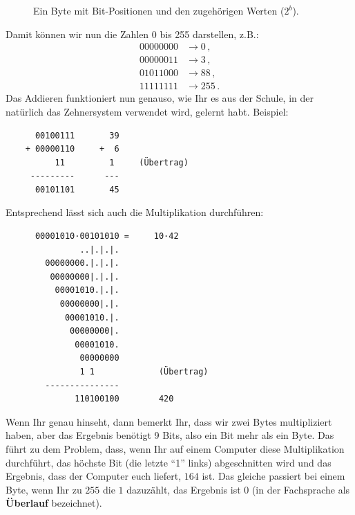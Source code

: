 \begin{figure}[h]
  \centering
  \caption{Ein Byte mit Bit-Positionen und den zugehörigen Werten ($2^b$).}
  \label{fig:byte_values}
\end{figure}

\noindent
Damit können wir nun die Zahlen 0 bis 255 darstellen, z.B.:
\begin{align*}
  00000000 &\rightarrow 0\,, \\
  00000011 &\rightarrow 3\,, \\
  01011000 &\rightarrow 88\,, \\
  11111111 &\rightarrow 255\,.
\end{align*}
Das Addieren funktioniert nun genauso, wie Ihr es aus der Schule, in der natürlich das Zehnersystem verwendet wird, gelernt habt. Beispiel:
\begin{lstlisting}
      00100111       39
    + 00000110     +  6
          11         1     (Übertrag)
     ---------      ---
      00101101       45
\end{lstlisting}
Entsprechend lässt sich auch die Multiplikation durchführen:
\begin{lstlisting}
      00001010·00101010 =     10·42
               ..|.|.|.
        00000000.|.|.|.
         00000000|.|.|.
          00001010.|.|.
           00000000|.|.
            00001010.|.
             00000000|.
              00001010.
               00000000
               1 1             (Übertrag)
        ---------------
              110100100        420
\end{lstlisting}
Wenn Ihr genau hinseht, dann bemerkt Ihr, dass wir zwei Bytes multipliziert haben, aber das Ergebnis benötigt 9 Bits, also ein Bit mehr als ein Byte. Das führt zu dem Problem, dass, wenn Ihr auf einem Computer diese Multiplikation durchführt, das höchste Bit (die letzte ``1'' links) abgeschnitten wird und das Ergebnis, dass der Computer euch liefert, $164$ ist. Das gleiche passiert bei einem Byte, wenn Ihr zu $255$ die $1$ dazuzählt, das Ergebnis ist $0$ (in der Fachsprache als \textbf{Überlauf} bezeichnet).

